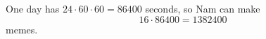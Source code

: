 One day has $24\cdot60\cdot60=86400$ seconds, so Nam can make
\[
16\cdot86400=\boxed{1382400}
\]
memes.
